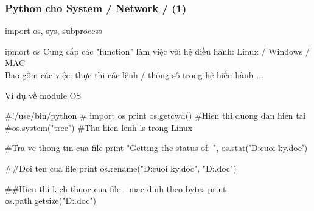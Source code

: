 \documentclass[12pt]{beamer}
\newcommand\Fontvi{\fontsize{6}{7.2}\selectfont} %
\newcommand\sFontvi{\fontsize{8}{7.2}\selectfont} %
\begin{document}
\label{Python System netowrk OS}
\begin{frame}[fragile]
\frametitle{Python cho System / Network / (1) }
import os, sys, subprocess
\begin{block}{ipmort os}
\sFontvi
Cung cấp các "function" làm việc với hệ điều hành: Linux / Windows / MAC  \\
Bao gồm các việc: thực thi các lệnh / thông số trong hệ hiều hành ...
\framebreak
\pause
\end{block}
\begin{block}{Ví dụ về module OS} \label{Vi du ve module OS}
\Fontvi
\begin{python}
#!/use/bin/python
#
import os
print os.getcwd() 	#Hien thi duong dan hien tai
#os.system("tree") 	#Thu hien lenh ls trong Linux

#Tra ve thong tin cua file 
print "Getting the status of: ", os.stat('D:\Feedback cuoi ky.doc')

##Doi ten cua file	
print os.rename("D:\Feedback cuoi ky.doc", "D:\phanhoi.doc")

##Hien thi kich thuoc cua file - mac dinh theo bytes
print os.path.getsize("D:\phanhoi.doc")
\end{python}
\end{block}

\end{frame}
\end{document}
